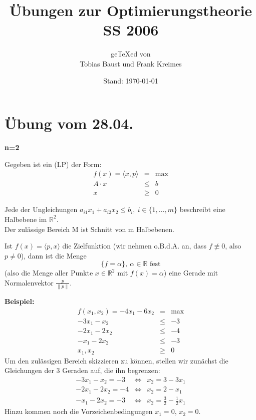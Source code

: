 \documentclass[a4paper,11pt,twoside,titlepage]{article}
\title{Übungen zur Optimierungstheorie\\ SS 2006}
\author{ge\TeX ed von\\Tobias Baust und Frank Kreimes}
\date{Stand: \today}
\newcommand{\R}{{\mathbb R}}
\begin{document}
\maketitle
\thispagestyle{empty}
\tableofcontents
{}
\thispagestyle{empty}
\cleardoublepage

\renewcommand{\thepage}{\arabic{page}}
\setcounter{page}{1}
\renewcommand{\thesection}{\arabic{section}}

\section{Übung vom 28.04.}
\textbf{n=2}

Gegeben ist ein (LP) der Form:
\begin{eqnarray*}
f(x)=\langle x,p\rangle&=&\max\\
A\cdot x&\leq&b\\
x&\geq&0
\end{eqnarray*}

Jede der Ungleichungen $a_{i1}x_1+a_{i2}x_2\leq b_i,\ i\in\{1,\ldots,m\}$ beschreibt eine Halbebene im $\R^2$.\\
Der zulässige Bereich M ist Schnitt von m Halbebenen.

Ist $f(x)=\langle p,x\rangle$ die Zielfunktion (wir nehmen o.B.d.A. an, dass $f\not\equiv0$, also $p\neq0$), dann ist die Menge \[\{f=\alpha\},\ \alpha\in\R\mbox{~fest}\] (also die Menge aller Punkte $x\in\R^2$ mit $f(x)=\alpha$) eine Gerade mit Normalenvektor $\frac{p}{\|p\|}$.

\textbf{Beispiel:}
\begin{eqnarray*}
f(x_1,x_2)=-4x_1-6x_2&=&\max\\
-3x_1-x_2&\leq&-3\\
-2x_1-2x_2&\leq&-4\\
-x_1-2x_2&\leq&-3\\
x_1,x_2&\geq&0
\end{eqnarray*}
Um den zulässigen Bereich skizzieren zu können, stellen wir zunächst die Gleichungen der 3 Geraden auf, die ihn begrenzen:
\begin{eqnarray}
-3x_1-x_2=-3&\Leftrightarrow&x_2=3-3x_1\\
-2x_1-2x_2=-4&\Leftrightarrow&x_2=2-x_1\\
-x_1-2x_2=-3&\Leftrightarrow&x_2=\frac{3}{2}-\frac{1}{2}x_1
\end{eqnarray}
Hinzu kommen noch die Vorzeichenbedingungen $x_1=0$, $x_2=0$.
\end{document}
